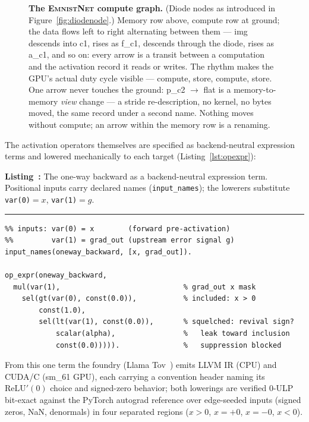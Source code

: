 \documentclass[11pt]{article}
\newcounter{lstcounter}
\renewcommand{\thelstcounter}{\arabic{lstcounter}}
\newenvironment{codelisting}[2]{%
  \refstepcounter{lstcounter}#1%
  \par\vspace{0.8\baselineskip}%
  \begin{mdframed}[nobreak=true,
     innerleftmargin=0.5em, innerrightmargin=0.5em,
     innertopmargin=0.5em, innerbottommargin=0.5em,
     skipabove=0.5\baselineskip, skipbelow=0.5\baselineskip,
     linewidth=0.4pt]%
  {\textbf{Listing~\thelstcounter:} #2\par}%
  \vspace{-6pt}\noindent\rule{\linewidth}{0.4pt}\par
  \vspace{-4pt}\small}{%
  \end{mdframed}}
\newcommand{\relu}{\mathrm{ReLU}}
\newcommand{\modelEmnistNet}{\textsc{EmnistNet}\xspace}
\begin{document}
\begin{figure}[H]
\caption{\textbf{The \modelEmnistNet compute graph.} (Diode nodes
as introduced in Figure~\ref{fig:diodenode}.) Memory row above,
compute row at ground; the data flows left to right alternating
between them --- img descends into c1, rises as f\_c1, descends
through the diode, rises as a\_c1, and so on: every arrow is a
transit between a computation and the activation record it reads or
writes. The rhythm makes the GPU's actual duty cycle visible ---
compute, store, compute, store. One arrow never touches the ground:
p\_c2 $\to$ flat is a memory-to-memory \emph{view} change --- a
stride re-description, no kernel, no bytes moved, the same record
under a second name. Nothing moves without compute; an arrow within
the memory row is a renaming.}
\label{fig:zigzag}
\end{figure}

The activation operators themselves are specified as backend-neutral
expression terms and lowered mechanically to each target
(Listing~\ref{lst:opexpr}):

\begin{codelisting}{\label{lst:opexpr}}{The one-way backward as a
backend-neutral expression term. Positional inputs carry declared
names (\texttt{input\_names}); the lowerers substitute
\texttt{var(0)}${=}x$, \texttt{var(1)}${=}g$.}
\begin{Verbatim}
%% inputs: var(0) = x        (forward pre-activation)
%%         var(1) = grad_out (upstream error signal g)
input_names(oneway_backward, [x, grad_out]).

op_expr(oneway_backward,
  mul(var(1),                             % grad_out x mask
    sel(gt(var(0), const(0.0)),           % included: x > 0
        const(1.0),
        sel(lt(var(1), const(0.0)),       % squelched: revival sign?
            scalar(alpha),                %   leak toward inclusion
            const(0.0))))).               %   suppression blocked
\end{Verbatim}
\end{codelisting}

From this one term the foundry (Llama Tov~\cite{llamatov2026})
emits LLVM IR (CPU) and CUDA/C (sm\_61 GPU), each carrying a
convention header naming its $\relu'(0)$ choice and signed-zero
behavior; both lowerings are
verified 0-ULP bit-exact against the PyTorch autograd reference over
edge-seeded inputs (signed zeros, NaN, denormals) in four separated
regions ($x{>}0$, $x{=}{+}0$, $x{=}{-}0$, $x{<}0$).
\end{document}
